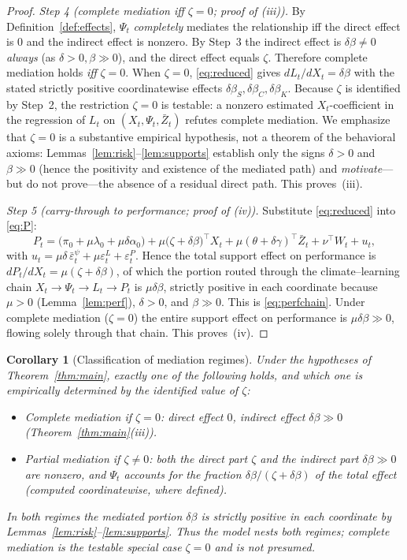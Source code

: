 \documentclass{amsart}
\newtheorem{corollary}{Corollary}
\theoremstyle{definition}
\theoremstyle{remark}
\begin{document}
\begin{proof}
\emph{Step 4 (complete mediation iff $\zeta=0$; proof of (iii)).}
By Definition~\ref{def:effects}, $\Psi_t$ \emph{completely} mediates the
relationship iff the direct effect is $0$ and the indirect effect is
nonzero. By Step~3 the indirect effect is $\delta\beta\neq0$ \emph{always}
(as $\delta>0,\beta\gg0$), and the direct effect equals $\zeta$. Therefore
complete mediation holds \emph{iff} $\zeta=0$. When $\zeta=0$,
\eqref{eq:reduced} gives $dL_t/dX_t=\delta\beta$ with the stated
strictly positive coordinatewise effects $\delta\beta_S,\delta\beta_C,
\delta\beta_K$. Because $\zeta$ is identified by Step~2, the restriction
$\zeta=0$ is testable: a nonzero estimated $X_t$-coefficient in the
regression of $L_t$ on $(X_t,\Psi_t,\bar Z_t)$ refutes complete mediation.
We emphasize that $\zeta=0$ is a substantive empirical hypothesis, not a
theorem of the behavioral axioms: Lemmas~\ref{lem:risk}--\ref{lem:supports}
establish only the signs $\delta>0$ and $\beta\gg0$ (hence the positivity
and existence of the mediated path) and \emph{motivate}---but do not
prove---the absence of a residual direct path. This proves~(iii).

\emph{Step 5 (carry-through to performance; proof of (iv)).}
Substitute \eqref{eq:reduced} into \eqref{eq:P}:
\[
P_t=\big(\pi_0+\mu\lambda_0+\mu\delta\alpha_0\big)
+\mu\big(\zeta+\delta\beta\big)^\top X_t
+\mu(\theta+\delta\gamma)^\top\bar Z_t
+\nu^\top W_t+ u_t,
\]
with $u_t=\mu\delta\,\bar\varepsilon^\psi_t+\mu\varepsilon^L_t
+\varepsilon^P_t$. Hence the total support effect on performance is
$dP_t/dX_t=\mu(\zeta+\delta\beta)$, of which the portion routed through the
climate--learning chain $X_t\to\Psi_t\to L_t\to P_t$ is $\mu\delta\beta$,
strictly positive in each coordinate because $\mu>0$
(Lemma~\ref{lem:perf}), $\delta>0$, and $\beta\gg0$. This is
\eqref{eq:perfchain}. Under complete mediation ($\zeta=0$) the entire
support effect on performance is $\mu\delta\beta\gg0$, flowing solely
through that chain. This proves~(iv).
\end{proof}

\begin{corollary}[Classification of mediation regimes]\label{cor:partial}
Under the hypotheses of Theorem~\ref{thm:main}, exactly one of the
following holds, and which one is empirically determined by the identified
value of $\zeta$:
\begin{itemize}
\item \emph{Complete mediation} if $\zeta=0$: direct effect $0$, indirect
effect $\delta\beta\gg0$ \textup{(Theorem~\ref{thm:main}(iii))}.
\item \emph{Partial mediation} if $\zeta\neq0$: both the direct part
$\zeta$ and the indirect part $\delta\beta\gg0$ are nonzero, and
$\Psi_t$ accounts for the fraction
$\delta\beta/(\zeta+\delta\beta)$ of the total effect (computed
coordinatewise, where defined).
\end{itemize}
In both regimes the mediated portion $\delta\beta$ is strictly positive in
each coordinate by Lemmas~\ref{lem:risk}--\ref{lem:supports}. Thus the
model nests both regimes; complete mediation is the testable special case
$\zeta=0$ and is \emph{not} presumed.
\end{corollary}
\end{document}
